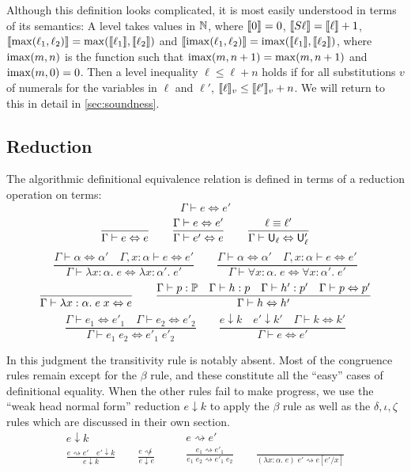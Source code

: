 Although this definition looks complicated, it is most easily understood in terms of its semantics: A level takes values in $\mathbb{N}$, where $\llbracket 0\rrbracket=0$, $\llbracket S\ell\rrbracket=\llbracket \ell\rrbracket+1$, $\llbracket \max(\ell_1,\ell_2)\rrbracket=\max(\llbracket \ell_1\rrbracket,\llbracket \ell_2\rrbracket)$ and $\llbracket \operatorname{imax}(\ell_1,\ell_2)\rrbracket=\operatorname{imax}(\llbracket \ell_1\rrbracket,\llbracket \ell_2\rrbracket)$, where $\operatorname{imax}(m,n)$ is the function such that $\operatorname{imax}(m,n+1)=\max(m,n+1)$ and $\operatorname{imax}(m,0)=0$. Then a level inequality $\ell\le\ell+n$ holds if for all substitutions $v$ of numerals for the variables in $\ell$ and $\ell'$, $\llbracket \ell\rrbracket_v\le \llbracket \ell'\rrbracket_v+n$. We will return to this in detail in \autoref{sec:soundness}.

\subsection{Reduction}
The algorithmic definitional equivalence relation is defined in terms of a reduction operation on terms:
%
$$\boxed{\Gamma\vdash e\Leftrightarrow e'}$$
$$\frac{}{\Gamma\vdash e\Leftrightarrow e}\qquad
\frac{\Gamma\vdash e\Leftrightarrow e'}{\Gamma\vdash e'\Leftrightarrow e}\qquad
\frac{\ell\equiv\ell'}{\Gamma\vdash\U_\ell\Leftrightarrow\U_\ell'}$$
$$\frac{\Gamma\vdash\alpha\Leftrightarrow\alpha'\quad \Gamma,x:\alpha\vdash e\Leftrightarrow e'}{\Gamma\vdash\lambda x:\alpha.\;e\Leftrightarrow \lambda x:\alpha'.\;e'}\qquad
\frac{\Gamma\vdash\alpha\Leftrightarrow\alpha'\quad \Gamma,x:\alpha\vdash e\Leftrightarrow e'}{\Gamma\vdash\forall x:\alpha.\;e\Leftrightarrow \forall x:\alpha'.\;e'}$$
$$\frac{}{\Gamma\vdash \lambda x:\alpha.\;e\;x\Leftrightarrow e}\qquad
\frac{\Gamma\vdash p:\P\quad \Gamma\vdash h:p\quad \Gamma\vdash h':p'\quad \Gamma \vdash p\Leftrightarrow p'}{\Gamma \vdash h\Leftrightarrow h'}$$
$$\frac{\Gamma\vdash e_1\Leftrightarrow e'_1\quad \Gamma\vdash e_2\Leftrightarrow e'_2}{\Gamma\vdash e_1\;e_2\Leftrightarrow e'_1\;e'_2}\qquad
\frac{e\downarrow k\quad e'\downarrow k'\quad \Gamma\vdash k\Leftrightarrow k'}{\Gamma\vdash e\Leftrightarrow e'}$$

In this judgment the transitivity rule is notably absent. Most of the congruence rules remain except for the $\beta$ rule, and these constitute all the ``easy'' cases of definitional equality. When the other rules fail to make progress, we use the ``weak head normal form'' reduction $e\downarrow k$ to apply the $\beta$ rule as well as the $\delta,\iota,\zeta$ rules which are discussed in their own section.
%
$$
\begin{matrix}
\boxed{e\downarrow k}\\[4mm]
\displaystyle{
\frac{e\rightsquigarrow e'\quad e'\downarrow k}{e\downarrow k}\qquad
\frac{e\not\rightsquigarrow}{e\downarrow e}}
\end{matrix}\qquad
\begin{matrix}
\boxed{e\rightsquigarrow e'}\\[4mm]
\displaystyle{
\frac{e_1\rightsquigarrow e'_1}{e_1\;e_2\rightsquigarrow e'_1\;e_2}\qquad
\frac{}{(\lambda x:\alpha.\;e)\;e'\rightsquigarrow e[e'/x]}}
\end{matrix}
$$

